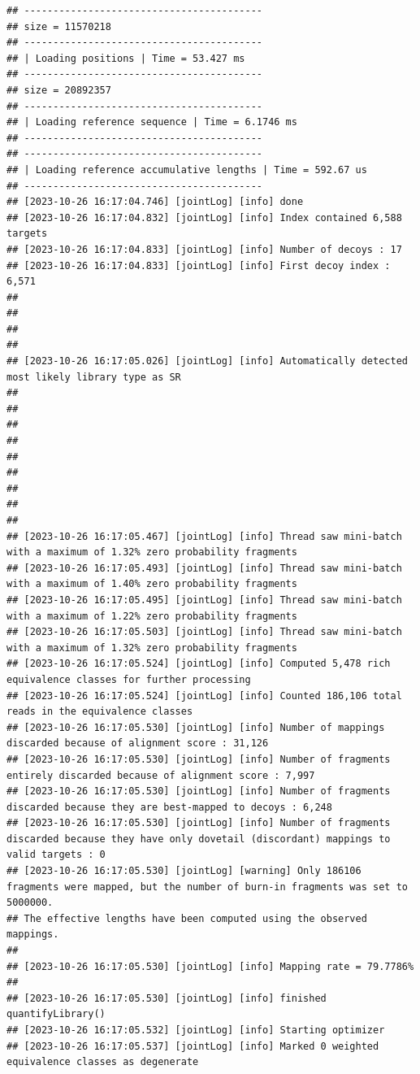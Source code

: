 \documentclass[
]{book}
\begin{document}
\begin{verbatim}
## -----------------------------------------
## size = 11570218
## -----------------------------------------
## | Loading positions | Time = 53.427 ms
## -----------------------------------------
## size = 20892357
## -----------------------------------------
## | Loading reference sequence | Time = 6.1746 ms
## -----------------------------------------
## -----------------------------------------
## | Loading reference accumulative lengths | Time = 592.67 us
## -----------------------------------------
## [2023-10-26 16:17:04.746] [jointLog] [info] done
## [2023-10-26 16:17:04.832] [jointLog] [info] Index contained 6,588 targets
## [2023-10-26 16:17:04.833] [jointLog] [info] Number of decoys : 17
## [2023-10-26 16:17:04.833] [jointLog] [info] First decoy index : 6,571 
## 
## 
## 
## 
## [2023-10-26 16:17:05.026] [jointLog] [info] Automatically detected most likely library type as SR
## 
## 
## 
## 
## 
## 
## 
## 
## 
## [2023-10-26 16:17:05.467] [jointLog] [info] Thread saw mini-batch with a maximum of 1.32% zero probability fragments
## [2023-10-26 16:17:05.493] [jointLog] [info] Thread saw mini-batch with a maximum of 1.40% zero probability fragments
## [2023-10-26 16:17:05.495] [jointLog] [info] Thread saw mini-batch with a maximum of 1.22% zero probability fragments
## [2023-10-26 16:17:05.503] [jointLog] [info] Thread saw mini-batch with a maximum of 1.32% zero probability fragments
## [2023-10-26 16:17:05.524] [jointLog] [info] Computed 5,478 rich equivalence classes for further processing
## [2023-10-26 16:17:05.524] [jointLog] [info] Counted 186,106 total reads in the equivalence classes 
## [2023-10-26 16:17:05.530] [jointLog] [info] Number of mappings discarded because of alignment score : 31,126
## [2023-10-26 16:17:05.530] [jointLog] [info] Number of fragments entirely discarded because of alignment score : 7,997
## [2023-10-26 16:17:05.530] [jointLog] [info] Number of fragments discarded because they are best-mapped to decoys : 6,248
## [2023-10-26 16:17:05.530] [jointLog] [info] Number of fragments discarded because they have only dovetail (discordant) mappings to valid targets : 0
## [2023-10-26 16:17:05.530] [jointLog] [warning] Only 186106 fragments were mapped, but the number of burn-in fragments was set to 5000000.
## The effective lengths have been computed using the observed mappings.
## 
## [2023-10-26 16:17:05.530] [jointLog] [info] Mapping rate = 79.7786%
## 
## [2023-10-26 16:17:05.530] [jointLog] [info] finished quantifyLibrary()
## [2023-10-26 16:17:05.532] [jointLog] [info] Starting optimizer
## [2023-10-26 16:17:05.537] [jointLog] [info] Marked 0 weighted equivalence classes as degenerate

\end{verbatim}
\end{document}
